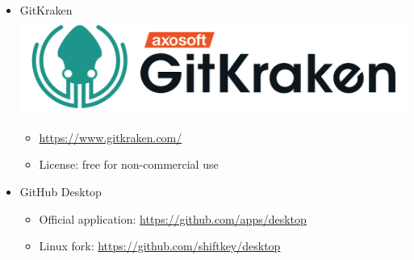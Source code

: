 \begin{frame}
\begin{itemize}
    \item GitKraken
        \includegraphics[height=0.05\textheight]{images/gitkraken-logo-dark-hz.png}
        \begin{itemize}
            \item \url{https://www.gitkraken.com/}
            \item License: free for non-commercial use
        \end{itemize}
    \item GitHub Desktop
        \begin{itemize}
            \item Official application: \url{https://github.com/apps/desktop}
            \item Linux fork: \url{https://github.com/shiftkey/desktop}
        \end{itemize}
\end{itemize}
\end{frame}

